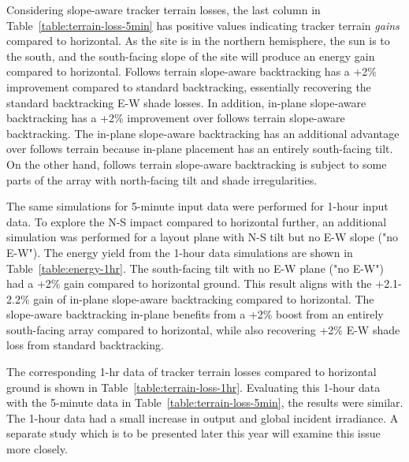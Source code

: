 \documentclass[conference]{IEEEtran}
\begin{document}
Considering slope-aware tracker terrain losses, the last column in Table~\ref{table:terrain-loss-5min} has positive values indicating tracker terrain \textit{gains} compared to horizontal. As the site is in the northern hemisphere, the sun is to the south, and the south-facing slope of the site will produce an energy gain compared to horizontal. Follows terrain slope-aware backtracking has a +2\% improvement compared to standard backtracking, essentially recovering the standard backtracking E-W shade losses. In addition, in-plane slope-aware backtracking has a +2\% improvement over follows terrain slope-aware backtracking. The in-plane slope-aware backtracking has an additional advantage over follows terrain because in-plane placement has an entirely south-facing tilt. On the other hand, follows terrain slope-aware backtracking is subject to some parts of the array with north-facing tilt and shade irregularities. 

The same simulations for 5-minute input data were performed for 1-hour input data. To explore the N-S impact compared to horizontal further, an additional simulation was performed for a layout plane with N-S tilt but no E-W slope ("no E-W"). The energy yield from the 1-hour data simulations are shown in Table~\ref{table:energy-1hr}. The south-facing tilt with no E-W plane ("no E-W") had a +2\% gain compared to horizontal ground. This result aligns with the +2.1-2.2\% gain of in-plane slope-aware backtracking compared to horizontal. The slope-aware backtracking in-plane benefits from a +2\% boost from an entirely south-facing array compared to horizontal, while also recovering +2\% E-W shade loss from standard backtracking. 

The corresponding 1-hr data of tracker terrain losses compared to horizontal ground is shown in Table~\ref{table:terrain-loss-1hr}. Evaluating this 1-hour data with the 5-minute data in Table~\ref{table:terrain-loss-5min}, the results were similar. The 1-hour data had a small increase in output and global incident irradiance. A separate study which is to be presented later this year will examine this issue more closely.
\end{document}
